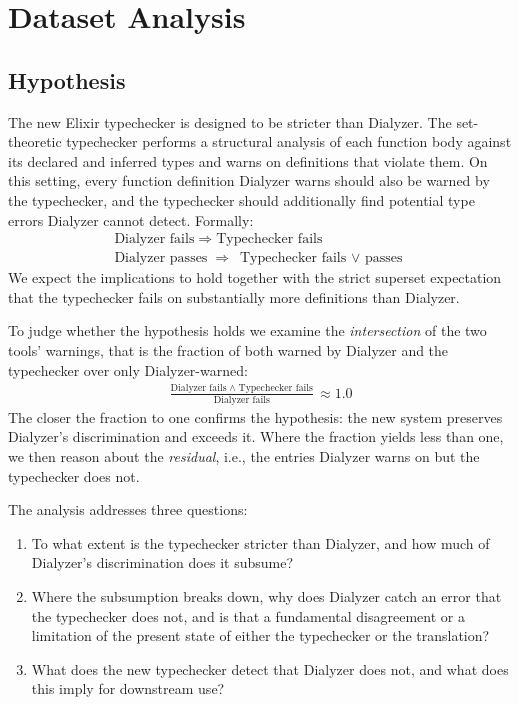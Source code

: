 \section{Dataset Analysis}
\label{sec:analysis}

\subsection{Hypothesis}
\label{sec:hypothesis}

The new Elixir typechecker is designed to be stricter than Dialyzer.
The set-theoretic typechecker performs a structural analysis of each function body against its declared and inferred types and warns on definitions that violate them.
On this setting, every function definition Dialyzer warns should also be warned by the typechecker, and the typechecker should additionally find potential type errors Dialyzer cannot detect.
Formally:
\begin{gather*}
  \text{Dialyzer fails} \;\Rightarrow\; \text{Typechecker fails} \\
  \text{Dialyzer passes} \;\Rightarrow\; \text{Typechecker fails $\vee$ passes}
\end{gather*}
We expect the implications to hold together with the strict superset expectation that the typechecker fails on substantially more definitions than Dialyzer.

To judge whether the hypothesis holds we examine the \emph{intersection} of the two tools' warnings, that is the fraction of both warned by Dialyzer and the typechecker over only Dialyzer-warned:
\begin{gather*}
  \frac{\text{Dialyzer fails} \;\wedge\; \text{Typechecker fails}}{\text{Dialyzer fails}} \approx 1.0
\end{gather*}
The closer the fraction to one confirms the hypothesis: the new system preserves Dialyzer's discrimination and exceeds it.
Where the fraction yields less than one, we then reason about the \emph{residual}, i.e., the entries Dialyzer warns on but the typechecker does not.

The analysis addresses three questions:
\begin{enumerate}
    \item To what extent is the typechecker stricter than Dialyzer, and how much of Dialyzer's discrimination does it subsume?
    \item Where the subsumption breaks down, why does Dialyzer catch an error that the typechecker does not, and is that a fundamental disagreement or a limitation of the present state of either the typechecker or the translation?
    \item What does the new typechecker detect that Dialyzer does not, and what does this imply for downstream use?
\end{enumerate}

